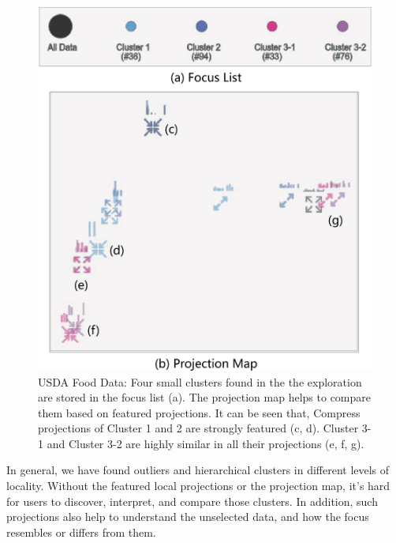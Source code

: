 \begin{figure}[htbp]
\centering
  \includegraphics[width=0.85\linewidth]{images/map_2.eps}%
  \caption{USDA Food Data: Four small clusters found in the the exploration are stored in the focus list (a). The projection map helps to compare them based on featured projections. It can be seen that, Compress projections of Cluster 1 and 2 are strongly featured (c, d). Cluster 3-1 and Cluster 3-2 are highly similar in all their projections (e, f, g).}
\label{fig:map}
  \end{figure}

 In general, we have found outliers and hierarchical clusters in different levels of locality. Without the featured local projections or the projection map, it's hard for users to discover, interpret, and compare those clusters. In addition, such projections also help to understand the unselected data, and how the focus resembles or differs from them.

